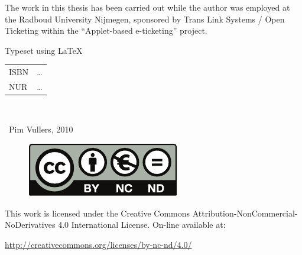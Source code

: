 \thispagestyle{empty}

\noindent
The work in this thesis has been carried out while the author was employed at
the Radboud University Nijmegen, sponsored by Trans Link Systems / Open
Ticketing within the ``Applet-based e-ticketing'' project.

\vspace{146mm}

\noindent Typeset using \LaTeX \\\null

\noindent
\begin{tabular}{ll}
  ISBN & \dots \\
  NUR  & \dots \\
\end{tabular} \\\null

\noindent
\textcopyright\ Pim Vullers, 2010 \\\null

\begin{figure}
  \vspace{-5mm}
  \includegraphics[scale=.94]{images/license}
  \vspace{-9mm}
\end{figure}

\noindent
This work is licensed under the Creative Commons Attribution-NonCommercial-NoDerivatives 4.0 International License. On-line available at:

\noindent
\url{http://creativecommons.org/licenses/by-nc-nd/4.0/}
